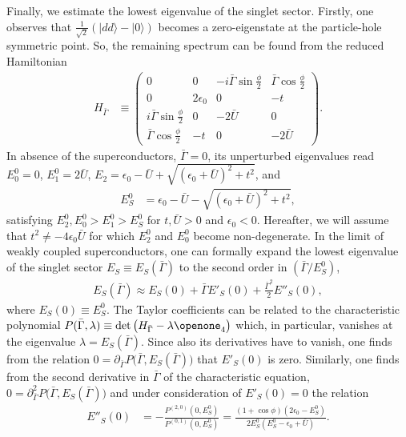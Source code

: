 \documentclass[aps,prb,twocolumn,superscriptaddress,amsmath,amssymb,longbibliography]{revtex4-1}
\newcommand{\ket}[1]{\ensuremath{|#1\rangle}}
\newcommand{\id}{{\ensuremath{\openone}}}
\begin{document}
	Finally, we estimate the lowest eigenvalue of the singlet sector. Firstly, one
	observes that $\frac{1}{\sqrt{2}}(\ket{dd}-\ket{0})$ becomes a zero-eigenstate at the particle-hole symmetric point.
	So, the remaining spectrum can be found from the reduced Hamiltonian
	\begin{align}
	H_{\bar\Gamma} &\equiv
			\begin{pmatrix}
	0&0&-i\bar\Gamma\sin\frac{\phi}{2}&\bar\Gamma\cos\frac{\phi}{2}\\
	0&2\epsilon_0&0&-t\\
	i\bar\Gamma\sin\frac{\phi}{2}&0&-2\bar U&0\\
	\bar\Gamma\cos\frac{\phi}{2}&-t&0&-2\bar U
			\end{pmatrix}.
	\end{align}
	In absence of the superconductors, $\bar\Gamma=0$, its unperturbed eigenvalues read
	$E_0^0 = 0$, $E_1^0 = 2\bar U$, $E_2=\epsilon_0-\bar U+\sqrt{(\epsilon_0+\bar U)^2+t^2}$, and
	\begin{align}
	E_{S}^0 &=\epsilon_0-\bar U-\sqrt{(\epsilon_0+\bar U)^2+t^2}
	\label{eq.:Epm},
	\end{align}
	satisfying $E_2^0,E_0^0>E_1^0>E_S^0$ for $t,\bar U>0$ and $\epsilon_0<0$.
	Hereafter, we will assume that $t^2\neq-4\epsilon_0\bar U$ for which $E_2^0$ and $E_0^0$ become non-degenerate.
	In the limit of weakly coupled superconductors, one can formally expand the lowest eigenvalue of the 
	singlet sector $E_S\equiv E_S(\bar\Gamma)$ to the second order in $(\bar\Gamma/E_S^0)$,
	\begin{align}
	E_S(\bar\Gamma) \approx E_S(0)+ \bar\Gamma E'_S(0)  + \frac{{\bar\Gamma}^2}{2} E''_S(0),
	\label{eq.:ESTaylor}
	\end{align}
	where $E_S(0)\equiv E_S^0$.
	The Taylor coefficients can be related to the characteristic polynomial $P(\bar\Gamma,\lambda) \equiv\det\big(H_{\bar\Gamma} -\lambda\id_4\big)$ which,
	in particular, vanishes at the eigenvalue $\lambda=E_S(\bar\Gamma)$. Since also its derivatives have to
	vanish, one finds from the relation $0=\partial_{\bar\Gamma}P\bm{(}\bar\Gamma,E_S(\bar\Gamma)\bm{)}$ that $E'_S(0)$ is zero.
	Similarly, one finds from the second derivative in $\bar\Gamma$ of the characteristic equation, 
	$0=\partial_{\bar\Gamma}^2 P\bm{(}\bar\Gamma,E_S(\bar\Gamma)\bm{)}$ and under consideration of $E'_S(0)=0$ the relation
	\begin{align}
	E''_S(0) &=-\frac{P^{(2,0)}(0,E_S^0)}{P^{(0,1)}(0,E_S^0)}
	= \frac{
		(1+\cos\phi)(2\epsilon_0-E_S^0)
	}{
		2E_S^0(E_S^0 -\epsilon_0+\bar U)
	}.
	\end{align}
\end{document}
